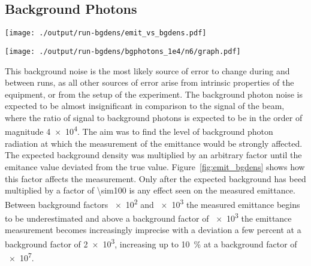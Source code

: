 

\subsection{Background Photons}

\begin{figure*}[!htbp]
	\begin{minipage}[t]{\columnwidth}
		\centering
		\texttt{[image: ./output/run-bgdens/emit\_vs\_bgdens.pdf]}
		\caption{
			Plot of the measured beam emittance against a factor of the expected
			background density of \SI{3.415e4}{photons\per\meter\squared}
		}
		\label{fig:emit_bgdens}
	\end{minipage}\hfill
	\begin{minipage}[t]{\columnwidth}
		\centering
		\texttt{[image: ./output/run-bgdens/bgphotons\_1e4/n6/graph.pdf]}
		\caption{
			Beam reconstruction for a background \num{1e4} times the expected
			background photon density.
		}
		\label{fig:large_bg}
	\end{minipage}
\end{figure*}

This background noise is the most likely source of error to change during and
between runs, as all other sources of error arise from intrinsic properties of
the equipment, or from the setup of the experiment. The background photon noise
is expected to be almost insignificant in comparison to the signal of the beam,
where the ratio of signal to background photons is expected to be in the order
of magnitude \num{4e4}. The aim was to find the level of background photon
radiation at which the measurement of the emittance would be strongly affected.
The expected background density was multiplied by an arbitrary factor until the
emitance value deviated from the true value.  Figure~\ref{fig:emit_bgdens} shows
how this factor affects the measurement. Only after the expected background has
beed multiplied by a factor of \num{\sim100} is any effect seen on the measured
emittance. Between background factors \num{e2} and \num{e3} the measured
emittance begins to be underestimated and above a background factor of \num{e3}
the emittance measurement becomes increasingly imprecise with a deviation a few
percent at a background factor of \num{2e3}, increasing up to \SI{10}{\percent}
at a background factor of \num{e7}.

